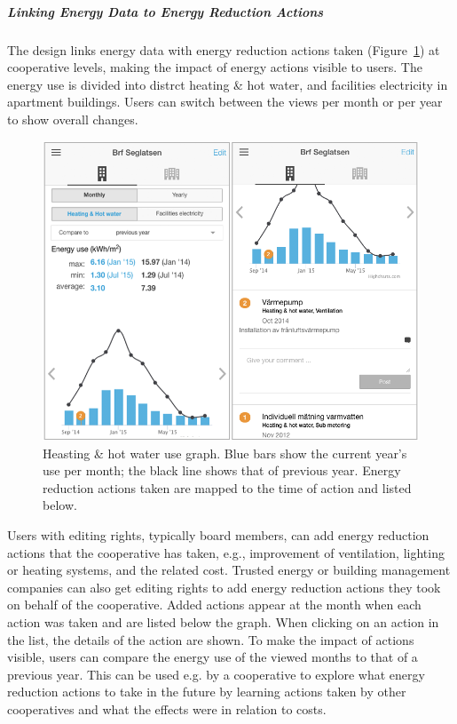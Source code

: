 \subparagraph{Linking Energy Data to Energy Reduction Actions}

The design links energy data with energy reduction actions taken (Figure~\ref{fig:Figure201_Actions}) at cooperative levels, making the impact of energy actions visible to users. The energy use is divided into distrct heating \& hot water, and facilities electricity in apartment buildings. Users can switch between the views per month or per year to show overall changes. %
%
\begin{figure}[t!]
	\sidecaption[t]
	\includegraphics[width=.64\linewidth]{img/Figure201_Actions.png}
	\caption{Heasting \& hot water use graph. Blue bars show the current year's use per month; the black line shows that of previous year. Energy reduction actions taken are mapped to the time of action and listed below.}
	\label{fig:Figure201_Actions}
\end{figure}
%
Users with editing rights, typically board members, can  add energy reduction actions that the cooperative has taken, e.g., improvement of ventilation, lighting or heating systems, 
and the related cost.
Trusted energy or building management companies can also get editing rights to add energy reduction actions they took on behalf of the cooperative. 
Added actions appear at the month when each action was taken and are listed below the graph. When clicking on an action in the list, the details of the action are shown.
% 
To make the impact of actions visible, users can compare the energy use of the viewed months to that of a previous year. This can be used e.g. by a cooperative to explore what energy reduction actions to take in the future by learning actions taken by other cooperatives and what the effects were in relation to costs.


